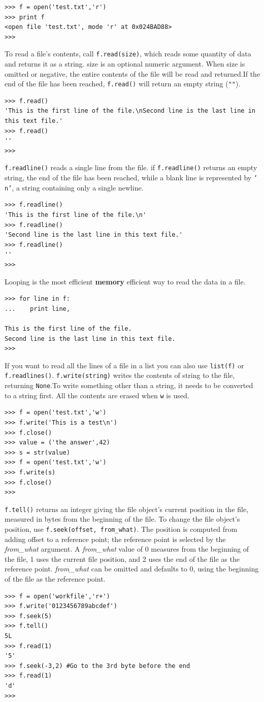 \documentclass[12pt,a4paper]{article}
\begin{document}
\begin{verbatim}
>>> f = open('test.txt','r')
>>> print f
<open file 'test.txt', mode 'r' at 0x024BAD88>
>>> 
\end{verbatim}
To read a file’s contents, call \texttt{f.read(size)}, which reads some quantity of data and returns it as a string. size is an optional numeric argument. When size is omitted or negative, the entire contents of the file will be read and returned.If the end of the file has been reached, \texttt{f.read()} will return an empty string (\texttt{""}).
\begin{verbatim}
>>> f.read()
'This is the first line of the file.\nSecond line is the last line in this text file.'
>>> f.read()
''
>>> 
\end{verbatim}
\texttt{f.readline()} reads a single line from the file. if \texttt{f.readline()} returns an empty string, the end of the file has been reached, while a blank line is represented by \texttt{'\\n'}, a string containing only a single newline.
\begin{verbatim}
>>> f.readline()
'This is the first line of the file.\n'
>>> f.readline()
'Second line is the last line in this text file.'
>>> f.readline()
''
>>> 
\end{verbatim}
Looping is the most efficient \textbf{memory} efficient way to read the data in a file.
\begin{verbatim}
>>> for line in f:
...    print line,

This is the first line of the file.
Second line is the last line in this text file.
>>> 
\end{verbatim}
If you want to read all the lines of a file in a list you can also use \texttt{list(f)} or \texttt{f.readlines()}.
\texttt{f.write(string)} writes the contents of string to the file, returning \texttt{None}.To write something other than a string, it needs to be converted to a string first. All the contents are erased when \texttt{w} is used. 
\begin{verbatim}
>>> f = open('test.txt','w')
>>> f.write('This is a test\n')
>>> f.close()
>>> value = ('the answer',42)
>>> s = str(value)
>>> f = open('test.txt','w')
>>> f.write(s)
>>> f.close()
>>> 
\end{verbatim}

\texttt{f.tell()} returns an integer giving the file object’s current position in the file, measured in bytes from the beginning of the file. To change the file object’s position, use \texttt{f.seek(offset, from\_what)}. The position is computed from adding offset to a reference point; the reference point is selected by the \textit{from\_what} argument. A \emph{from\_what} value of 0 measures from the beginning of the file, 1 uses the current file position, and 2 uses the end of the file as the reference point. \emph{from\_what} can be omitted and defaults to 0, using the beginning of the file as the reference point.
\begin{verbatim}
>>> f = open('workfile','r+')
>>> f.write('0123456789abcdef')
>>> f.seek(5)
>>> f.tell()
5L
>>> f.read(1)
'5'
>>> f.seek(-3,2) #Go to the 3rd byte before the end
>>> f.read(1)
'd'
>>> 
\end{verbatim}
\end{document}
